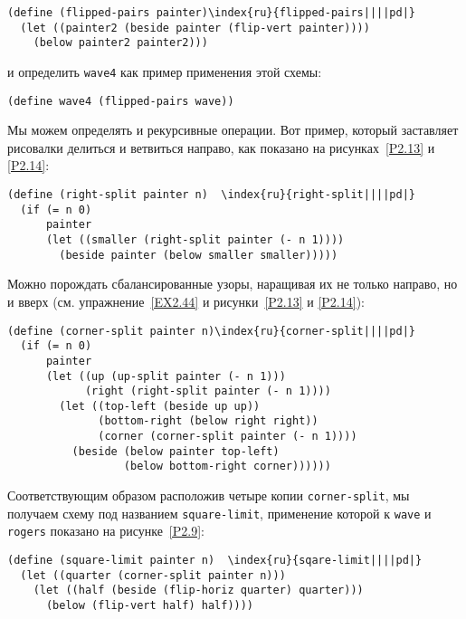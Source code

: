 \begin{Verbatim}[fontsize=\small]
(define (flipped-pairs painter)\index{ru}{flipped-pairs||||pd|}
  (let ((painter2 (beside painter (flip-vert painter))))
    (below painter2 painter2)))
\end{Verbatim}
и определить {\tt wave4} как пример применения этой схемы:

\begin{Verbatim}[fontsize=\small]
(define wave4 (flipped-pairs wave))
\end{Verbatim}

Мы можем определять и рекурсивные операции.  Вот пример,
который заставляет рисовалки делиться и ветвиться направо, как
показано на рисунках~\ref{P2.13} и \ref{P2.14}:

\begin{Verbatim}[fontsize=\small]
(define (right-split painter n)  \index{ru}{right-split||||pd|}
  (if (= n 0)
      painter
      (let ((smaller (right-split painter (- n 1))))
        (beside painter (below smaller smaller)))))
\end{Verbatim}
Можно порождать сбалансированные узоры, наращивая их не только направо, но
и вверх (см. упражнение~\ref{EX2.44} и рисунки~\ref{P2.13} и \ref{P2.14}):

\begin{Verbatim}[fontsize=\small]
(define (corner-split painter n)\index{ru}{corner-split||||pd|}
  (if (= n 0)
      painter
      (let ((up (up-split painter (- n 1)))
            (right (right-split painter (- n 1))))
        (let ((top-left (beside up up))
              (bottom-right (below right right))
              (corner (corner-split painter (- n 1))))
          (beside (below painter top-left)
                  (below bottom-right corner))))))
\end{Verbatim}
Соответствующим образом расположив четыре копии
{\tt corner-split}, мы получаем схему под названием
{\tt square-limit}, применение которой к {\tt wave} и
{\tt rogers} показано на рисунке~\ref{P2.9}:

\begin{Verbatim}[fontsize=\small]
(define (square-limit painter n)  \index{ru}{sqare-limit||||pd|}
  (let ((quarter (corner-split painter n)))
    (let ((half (beside (flip-horiz quarter) quarter)))
      (below (flip-vert half) half))))
\end{Verbatim}


